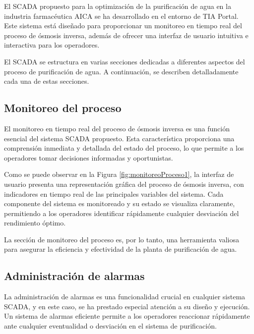El SCADA propuesto para la optimización de la purificación de agua en la industria farmacéutica AICA se ha desarrollado en el entorno de TIA Portal. Este sistema está diseñado para proporcionar un monitoreo en tiempo real del proceso de ósmosis inversa, además de ofrecer una interfaz de usuario intuitiva e interactiva para los operadores.


El SCADA se estructura en varias secciones dedicadas a diferentes aspectos del proceso de purificación de agua. A continuación, se describen detalladamente cada una de estas secciones.

\subsection{Monitoreo del proceso}

El monitoreo en tiempo real del proceso de ósmosis inversa es una función esencial del sistema SCADA propuesto. Esta característica proporciona una comprensión inmediata y detallada del estado del proceso, lo que permite a los operadores tomar decisiones informadas y oportunistas.


Como se puede observar en la Figura \ref{fig:monitoreoProceso1}, la interfaz de usuario presenta una representación gráfica del proceso de ósmosis inversa, con indicadores en tiempo real de las principales variables del sistema. Cada componente del sistema es monitoreado y su estado se visualiza claramente, permitiendo a los operadores identificar rápidamente cualquier desviación del rendimiento óptimo.

La sección de monitoreo del proceso es, por lo tanto, una herramienta valiosa para asegurar la eficiencia y efectividad de la planta de purificación de agua.

\subsection{Administración de alarmas}

La administración de alarmas es una funcionalidad crucial en cualquier sistema SCADA, y en este caso, se ha prestado especial atención a su diseño y ejecución. Un sistema de alarmas eficiente permite a los operadores reaccionar rápidamente ante cualquier eventualidad o desviación en el sistema de purificación.

